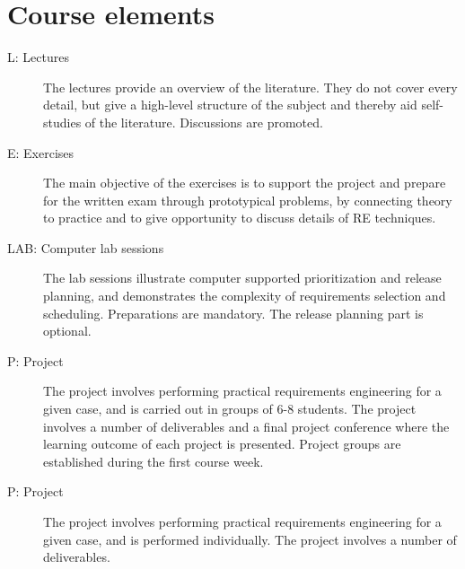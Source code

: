 \section{Course elements}
\begin{description}
\item[L: Lectures] The lectures provide an overview of the literature. They do not cover every detail, but give a high-level structure of the subject and thereby aid self-studies of the literature. Discussions are promoted.
\item[E: Exercises] The main objective of the exercises is to support the project and prepare for the written exam through prototypical problems, by connecting theory to practice and to give opportunity to discuss details of RE techniques.
\item[LAB: Computer lab sessions] The lab sessions illustrate computer supported
prioritization and release planning, and demonstrates the complexity of requirements selection and scheduling. Preparations are mandatory. %
\ifteknolog\else
The release planning part is optional.
\fi
\ifteknolog
	\item[P: Project] The project involves performing practical requirements engineering for a given case, and is carried out in groups of 6-8 students. The project involves a number of deliverables and a final project conference where the learning outcome of each project is presented. Project groups are established during the first course week.
\else
	\item[P: Project] The project involves performing practical requirements engineering for a given case, and is performed individually. The project involves a number of deliverables.
\fi

\end{description}




